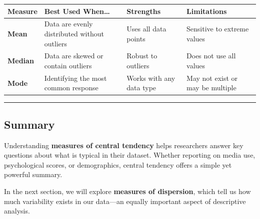 \documentclass[
]{book}
\begin{document}
\begin{longtable}[]{@{}
  >{\raggedright\arraybackslash}p{}
  >{\raggedright\arraybackslash}p{}
  >{\raggedright\arraybackslash}p{}
  >{\raggedright\arraybackslash}p{}@{}}
\toprule\noalign{}
\begin{minipage}[b]{\linewidth}\raggedright
Measure
\end{minipage} & \begin{minipage}[b]{\linewidth}\raggedright
Best Used When\ldots{}
\end{minipage} & \begin{minipage}[b]{\linewidth}\raggedright
Strengths
\end{minipage} & \begin{minipage}[b]{\linewidth}\raggedright
Limitations
\end{minipage} \\
\midrule\noalign{}
\endhead
\bottomrule\noalign{}
\endlastfoot
\textbf{Mean} & Data are evenly distributed without outliers & Uses all data points & Sensitive to extreme values \\
\textbf{Median} & Data are skewed or contain outliers & Robust to outliers & Does not use all values \\
\textbf{Mode} & Identifying the most common response & Works with any data type & May not exist or may be multiple \\
\end{longtable}

\begin{center}\rule{0.5\linewidth}{0.5pt}\end{center}

\subsection*{Summary}\label{summary}

Understanding \textbf{measures of central tendency} helps researchers answer key questions about what is typical in their dataset. Whether reporting on media use, psychological scores, or demographics, central tendency offers a simple yet powerful summary.

In the next section, we will explore \textbf{measures of dispersion}, which tell us how much variability exists in our data---an equally important aspect of descriptive analysis.
\end{document}

